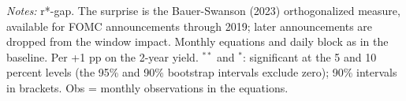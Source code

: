 \begin{flushleft}\footnotesize\textit{Notes:} r*-gap. The surprise is the Bauer-Swanson (2023) orthogonalized measure, available for FOMC announcements through 2019; later announcements are dropped from the window impact. Monthly equations and daily block as in the baseline. Per +1 pp on the 2-year yield. $^{**}$ and $^{*}$: significant at the 5 and 10 percent levels (the 95\% and 90\% bootstrap intervals exclude zero); 90\% intervals in brackets. Obs = monthly observations in the equations.\end{flushleft}
\endgroup
